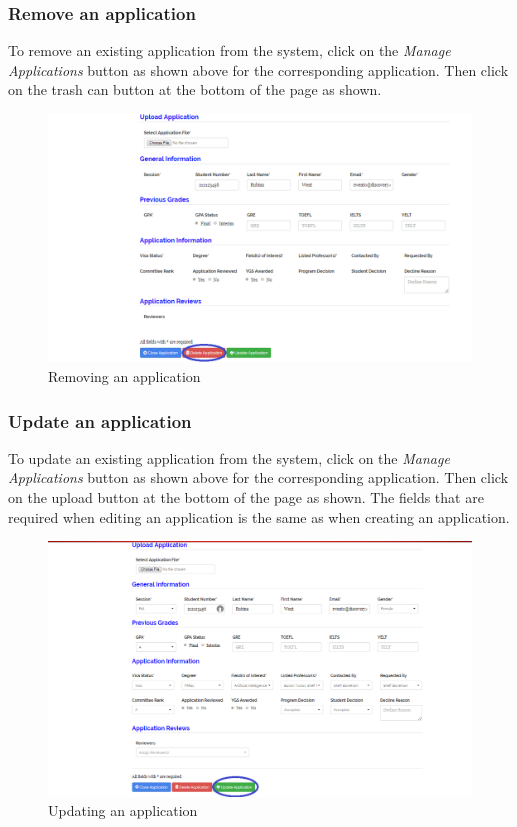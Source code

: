 \documentclass[fontsize=12pt,paper=letter,twoside]{scrartcl}
\begin{document}
\clearpage
\subsubsection{Remove an application}
To remove an existing application from the system, click on the \emph{Manage Applications} button as shown above for the corresponding application. Then click on the trash can button at the bottom of the page as shown.

\begin{figure}[!htb]
\begin{center}
\includegraphics[width=.99\textwidth]{images/adm/ma/remove_appl.png}
\end{center}
\caption{Removing an application}
\label{fig:adm/remove_appl}
\end{figure}

\clearpage
\subsubsection{Update an application}
To update an existing application from the system, click on the \emph{Manage Applications} button as shown above for the corresponding application. Then click on the upload button at the bottom of the page as shown. The fields that are required when editing an application is the same as when creating an application.

\begin{figure}[!htb]
\begin{center}
\includegraphics[width=.99\textwidth]{images/adm/ma/update_appl.png}
\end{center}
\caption{Updating an application}
\label{fig:adm/update_appl}
\end{figure}
\end{document}
